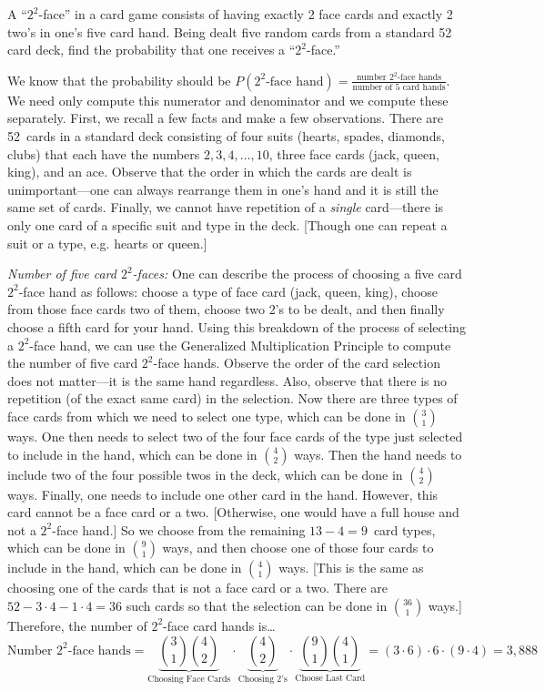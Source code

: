 \documentclass[11pt,letterpaper]{article}
\begin{document}
\newpage



 A ``$2^2$-face'' in a card game consists of having exactly 2 face cards and exactly 2 two's in one's five card hand. Being dealt five random cards from a standard 52 card deck, find the probability that one receives a ``$2^2$-face.'' \pspace

\sol We know that the probability should be $P(2^2 \text{-face hand})= \tfrac{\text{number } 2^2 \text{-face hands}}{\text{number of 5 card hands}}$. We need only compute this numerator and denominator and we compute these separately. First, we recall a few facts and make a few observations. There are 52~cards in a standard deck consisting of four suits (hearts, spades, diamonds, clubs) that each have the numbers $2, 3, 4, \ldots, 10$, three face cards (jack, queen, king), and an ace. Observe that the order in which the cards are dealt is unimportant---one can always rearrange them in one's hand and it is still the same set of cards. Finally, we cannot have repetition of a \textit{single} card---there is only one card of a specific suit and type in the deck. [Though one can repeat a suit or a type, e.g. hearts or queen.] \pspace

{\itshape Number of five card $2^2$-faces:} One can describe the process of choosing a five card $2^2$-face hand as follows: choose a type of face card (jack, queen, king), choose from those face cards two of them, choose two 2's to be dealt, and then finally choose a fifth card for your hand. Using this breakdown of the process of selecting a $2^2$-face hand, we can use the Generalized Multiplication Principle to compute the number of five card $2^2$-face hands. Observe the order of the card selection does not matter---it is the same hand regardless. Also, observe that there is no repetition (of the exact same card) in the selection. Now there are three types of face cards from which we need to select one type, which can be done in $\binom{3}{1}$ ways. One then needs to select two of the four face cards of the type just selected to include in the hand, which can be done in $\binom{4}{2}$ ways. Then the hand needs to include two of the four possible twos in the deck, which can be done in $\binom{4}{2}$ ways. Finally, one needs to include one other card in the hand. However, this card cannot be a face card or a two. [Otherwise, one would have a full house and not a $2^2$-face hand.] So we choose from the remaining $13 - 4= 9$~card types, which can be done in $\binom{9}{1}$ ways, and then choose one of those four cards to include in the hand, which can be done in $\binom{4}{1}$ ways. [This is the same as choosing one of the cards that is not a face card or a two. There are $52 - 3 \cdot 4 - 1 \cdot 4= 36$ such cards so that the selection can be done in $\binom{36}{1}$ ways.] Therefore, the number of $2^2$-face card hands is\dots
	\[
	\text{Number } 2^2 \text{-face hands}= \underbrace{\binom{3}{1} \binom{4}{2}}_{\text{Choosing Face Cards}} \cdot \underbrace{\binom{4}{2}}_{\text{Choosing 2's}} \cdot \underbrace{\binom{9}{1} \binom{4}{1}}_{\text{Choose Last Card}}= (3 \cdot 6) \cdot 6 \cdot (9 \cdot 4)= 3,\!888
	\] \pspace
\end{document}
